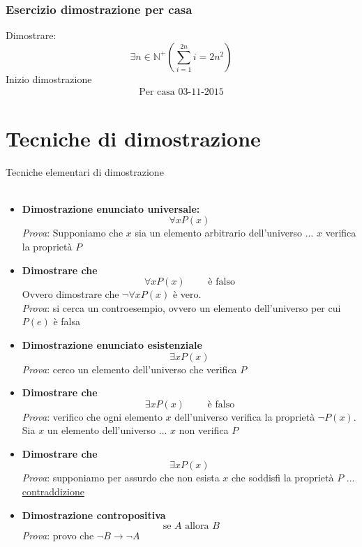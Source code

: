 \documentclass[italian]{article}
\newcommand{\N}{\text{$\mathbb{N}$}}
\begin{document}
\subsubsection{Esercizio dimostrazione per casa}
Dimostrare:
\[
	\exists n \in \N^+ \left( \sum_{i=1}^{2n}i=2n^2 \right)
\]
Inizio dimostrazione
\begin{gather*}
\text{Per casa 03-11-2015}
\end{gather*}

\pagebreak
\section{Tecniche di dimostrazione}
Tecniche elementari di dimostrazione\\\\
\begin{itemize}
	\item
		\textbf{Dimostrazione enunciato universale:}
		\[
			\forall xP(x)
		\]
		\textit{Prova}: Supponiamo che $x$ sia un elemento arbitrario dell'universo ... $x$ verifica la proprietà $P$
		
	\item
		\textbf{Dimostrare che}
		\[
			\forall xP(x) \qquad \text{ è falso}
		\]
		Ovvero dimostrare che $\lnot \forall xP(x)$ è vero.\\
		\textit{Prova}: si cerca un controesempio, ovvero un elemento dell'universo per cui $P(e)$ è falsa
		
	\item
		\textbf{Dimostrazione enunciato esistenziale}
		\[
			\exists x P(x)
		\]
		\textit{Prova}: cerco un elemento dell'universo che verifica $P$
		
	\item
		\textbf{Dimostrare che}
		\[
			\exists x P(x) \qquad \text{ è falso}
		\]
		\textit{Prova}: verifico che ogni elemento $x$ dell'universo verifica la proprietà $\lnot P(x)$. Sia $x$ un elemento dell'universo ... $x$ non verifica $P$
		
	\item
		\textbf{Dimostrare che}
		\[
			\exists xP(x)
		\]
		\textit{Prova}: supponiamo per assurdo che non esista $x$ che soddisfi la proprietà $P$ ... \underline{contraddizione}
		
	\item
		\textbf{Dimostrazione contropositiva}
		\[
			\text{ se $A$ allora $B$}
		\]
		\textit{Prova}: provo che $\lnot B \to \lnot A$
\end{itemize}

\pagebreak
\end{document}
